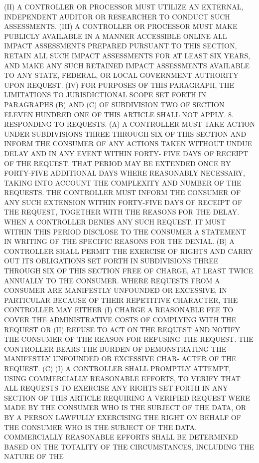    (II)  A  CONTROLLER OR PROCESSOR MUST UTILIZE AN EXTERNAL, INDEPENDENT
 AUDITOR OR RESEARCHER TO CONDUCT SUCH ASSESSMENTS.
   (III)  A  CONTROLLER  OR  PROCESSOR  MUST MAKE PUBLICLY AVAILABLE IN A
 MANNER ACCESSIBLE ONLINE ALL IMPACT  ASSESSMENTS  PREPARED  PURSUANT  TO
 THIS SECTION, RETAIN ALL SUCH IMPACT ASSESSMENTS FOR AT LEAST SIX YEARS,
 AND  MAKE  ANY  SUCH RETAINED IMPACT ASSESSMENTS AVAILABLE TO ANY STATE,
 FEDERAL, OR LOCAL GOVERNMENT AUTHORITY UPON REQUEST.
   (IV) FOR PURPOSES OF THIS PARAGRAPH, THE LIMITATIONS TO JURISDICTIONAL
 SCOPE SET FORTH IN PARAGRAPHS (B) AND (C) OF SUBDIVISION TWO OF  SECTION
 ELEVEN HUNDRED ONE OF THIS ARTICLE SHALL NOT APPLY.
   8.  RESPONDING  TO  REQUESTS.  (A) A CONTROLLER MUST TAKE ACTION UNDER
 SUBDIVISIONS THREE THROUGH SIX OF THIS SECTION AND INFORM  THE  CONSUMER
 OF  ANY ACTIONS TAKEN WITHOUT UNDUE DELAY AND IN ANY EVENT WITHIN FORTY-
 FIVE DAYS OF RECEIPT OF THE REQUEST. THAT PERIOD MAY BE EXTENDED ONCE BY
 FORTY-FIVE ADDITIONAL  DAYS  WHERE  REASONABLY  NECESSARY,  TAKING  INTO
 ACCOUNT  THE  COMPLEXITY AND NUMBER OF THE REQUESTS. THE CONTROLLER MUST
 INFORM THE CONSUMER OF ANY SUCH  EXTENSION  WITHIN  FORTY-FIVE  DAYS  OF
 RECEIPT  OF THE REQUEST, TOGETHER WITH THE REASONS FOR THE DELAY. WHEN A
 CONTROLLER DENIES ANY SUCH REQUEST, IT MUST WITHIN THIS PERIOD  DISCLOSE
 TO  THE  CONSUMER A STATEMENT IN WRITING OF THE SPECIFIC REASONS FOR THE
 DENIAL.
   (B) A CONTROLLER SHALL PERMIT THE EXERCISE OF RIGHTS AND CARRY OUT ITS
 OBLIGATIONS SET FORTH IN SUBDIVISIONS THREE THROUGH SIX OF THIS  SECTION
 FREE  OF CHARGE, AT LEAST TWICE ANNUALLY TO THE CONSUMER. WHERE REQUESTS
 FROM A CONSUMER ARE MANIFESTLY UNFOUNDED  OR  EXCESSIVE,  IN  PARTICULAR
 BECAUSE  OF  THEIR  REPETITIVE  CHARACTER, THE CONTROLLER MAY EITHER (I)
 CHARGE A REASONABLE FEE TO COVER THE ADMINISTRATIVE COSTS  OF  COMPLYING
 WITH  THE  REQUEST  OR  (II) REFUSE TO ACT ON THE REQUEST AND NOTIFY THE
 CONSUMER OF THE REASON FOR REFUSING THE REQUEST.  THE  CONTROLLER  BEARS
 THE  BURDEN OF DEMONSTRATING THE MANIFESTLY UNFOUNDED OR EXCESSIVE CHAR-
 ACTER OF THE REQUEST.
   (C) (I)  A  CONTROLLER  SHALL  PROMPTLY  ATTEMPT,  USING  COMMERCIALLY
 REASONABLE  EFFORTS,  TO VERIFY THAT ALL REQUESTS TO EXERCISE ANY RIGHTS
 SET FORTH IN ANY SECTION OF THIS ARTICLE REQUIRING  A  VERIFIED  REQUEST
 WERE MADE BY THE CONSUMER WHO IS THE SUBJECT OF THE DATA, OR BY A PERSON
 LAWFULLY  EXERCISING  THE  RIGHT  ON  BEHALF  OF THE CONSUMER WHO IS THE
 SUBJECT OF THE DATA. COMMERCIALLY REASONABLE EFFORTS SHALL BE DETERMINED
 BASED ON THE TOTALITY OF THE CIRCUMSTANCES, INCLUDING THE NATURE OF  THE
